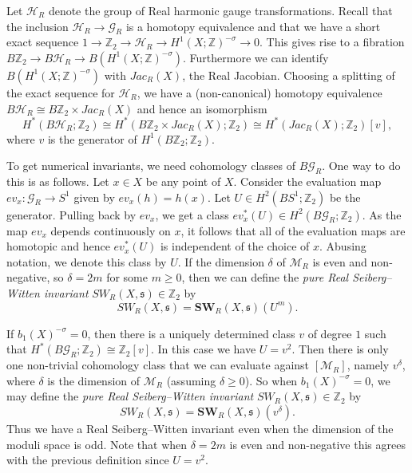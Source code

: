 \documentclass{amsart}
\theoremstyle{definition}
\theoremstyle{remark}
\numberwithin{equation}{section}
\begin{document}
Let $\mathcal{H}_R$ denote the group of Real harmonic gauge transformations. Recall that the inclusion $\mathcal{H}_R \to \mathcal{G}_R$ is a homotopy equivalence and that we have a short exact sequence $1 \to \mathbb{Z}_2 \to \mathcal{H}_R \to H^1(X ; \mathbb{Z})^{-\sigma} \to 0$. This gives rise to a fibration $B\mathbb{Z}_2 \to B\mathcal{H}_R \to B(H^1( X ; \mathbb{Z})^{-\sigma} )$. Furthermore we can identify $B(H^1(X ; \mathbb{Z})^{-\sigma} )$ with $Jac_R(X)$, the Real Jacobian. Choosing a splitting of the exact sequence for $\mathcal{H}_R$, we have a (non-canonical) homotopy equivalence $B\mathcal{H}_R \cong B\mathbb{Z}_2 \times Jac_R(X)$ and hence an isomorphism 
\[
H^*( B\mathcal{H}_R ; \mathbb{Z}_2) \cong H^*( B\mathbb{Z}_2 \times Jac_R(X) ; \mathbb{Z}_2 ) \cong H^*(Jac_R(X) ; \mathbb{Z}_2)[v],
\]
where $v$ is the generator of $H^1(B\mathbb{Z}_2 ; \mathbb{Z}_2)$.

To get numerical invariants, we need cohomology classes of $B\mathcal{G}_R$. One way to do this is as follows. Let $x \in X$ be any point of $X$.  Consider the evaluation map $ev_x : \mathcal{G}_R \to S^1$ given by $ev_x(h) = h(x)$. Let $U \in H^2( BS^1 ; \mathbb{Z}_2)$ be the generator. Pulling back by $ev_x$, we get a class $ev_x^*(U) \in H^2( B\mathcal{G}_R ; \mathbb{Z}_2)$. As the map $ev_x$ depends continuously on $x$, it follows that all of the evaluation maps are homotopic and hence $ev_x^*(U)$ is independent of the choice of $x$. Abusing notation, we denote this class by $U$. If the dimension $\delta$ of $\mathcal{M}_R$ is even and non-negative, so $\delta = 2m$ for some $m \ge 0$, then we can define the {\em pure Real Seiberg--Witten invariant} $SW_R(X , \mathfrak{s}) \in \mathbb{Z}_2$ by 
\[
SW_R(X , \mathfrak{s}) = \mathbf{SW}_R(X , \mathfrak{s})( U^m ).
\]

If $b_1(X)^{-\sigma} = 0$, then there is a uniquely determined class $v$ of degree $1$ such that $H^*( B\mathcal{G}_R ; \mathbb{Z}_2) \cong \mathbb{Z}_2[v]$. In this case we have $U = v^2$. Then there is only one non-trivial cohomology class that we can evaluate against $[\mathcal{M}_R]$, namely $v^\delta$, where $\delta$ is the dimension of $\mathcal{M}_R$ (assuming $\delta \ge 0$). So when $b_1(X)^{-\sigma} = 0$, we may define the {\em pure Real Seiberg--Witten invariant} $SW_R(X , \mathfrak{s}) \in \mathbb{Z}_2$ by 
\[
SW_R(X , \mathfrak{s}) = \mathbf{SW}_R(X , \mathfrak{s})( v^\delta).
\]
Thus we have a Real Seiberg--Witten invariant even when the dimension of the moduli space is odd. Note that when $\delta = 2m$ is even and non-negative this agrees with the previous definition since $U = v^2$.
\end{document}
